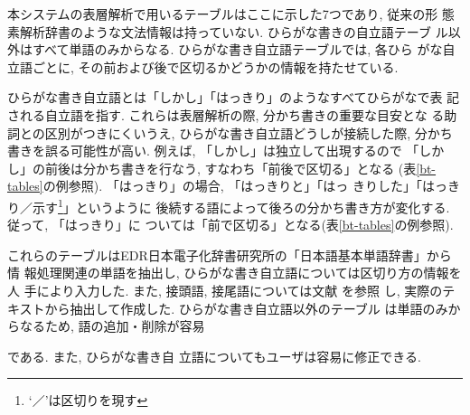 本システムの表層解析で用いるテーブルはここに示した7つであり, 従来の形
態素解析辞書のような文法情報は持っていない. ひらがな書きの自立語テーブ
ル以外はすべて単語のみからなる. ひらがな書き自立語テーブルでは, 各ひら
がな自立語ごとに, その前および後で区切るかどうかの情報を持たせている. 

ひらがな書き自立語とは「しかし」「はっきり」のようなすべてひらがなで表
記される自立語を指す. これらは表層解析の際, 分かち書きの重要な目安とな
る助詞との区別がつきにくいうえ, ひらがな書き自立語どうしが接続した際, 
分かち書きを誤る可能性が高い. 例えば, 「しかし」は独立して出現するので
「しかし」の前後は分かち書きを行なう, すなわち「前後で区切る」となる
(表\ref{bt-tables}の例参照). 「はっきり」の場合, 「はっきりと」「はっ
きりした」「はっきり／示す\footnote{`／'は区切りを現す}」というように
後続する語によって後ろの分かち書き方が変化する. 従って, 「はっきり」に
ついては「前で区切る」となる(表\ref{bt-tables}の例参照). 

これらのテーブルはEDR日本電子化辞書研究所の「日本語基本単語辞書」から情
報処理関連の単語を抽出し, ひらがな書き自立語については区切り方の情報を人
手により入力した. また, 接頭語, 接尾語については文献 \cite{nagao}を参照
し, 実際のテキストから抽出して作成した. ひらがな書き自立語以外のテーブル
は単語のみからなるため, 語の追加・削除が容易

\newpage

\begin{flushleft}
である. また, ひらがな書き自
立語についてもユーザは容易に修正できる. 
\end{flushleft}

